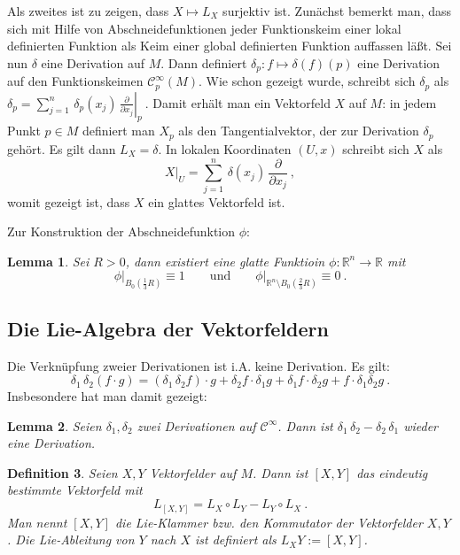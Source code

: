 \documentclass[12pt,a4paper]{article}
\def\R{\mathbb{R}}
\newtheorem{Lemma}{Lemma}[section]
\newtheorem{Definition}[Lemma]{Definition}
\def\proof{\noindent\textbf{Beweis:}\quad}
\def\qed{\quad\hfill\ensuremath{\Box}}
\begin{document}
\medskip

Als zweites ist zu zeigen, dass $X\mapsto L_X$ surjektiv ist. Zun\"achst bemerkt man, dass sich mit
Hilfe von Abschneidefunktionen jeder Funktionskeim einer lokal definierten Funktion als Keim einer
global definierten Funktion auffassen l\"a\ss t. Sei nun $\delta$ eine Derivation auf $M$. Dann
definiert $\delta_p : f\mapsto \delta(f)(p)$ eine Derivation auf den Funktionskeimen $\mathcal C^\infty_p(M)$.
Wie schon gezeigt wurde, schreibt sich $\delta_p$ als
$
\delta_p =\sum^n_{j=1} \, \delta_p(x_j)\,\left. \frac{\partial}{\partial x_j}\right|_p \ .
$
Damit erh\"alt man ein Vektorfeld $X$ auf $M$: in jedem Punkt $p\in M$ definiert man $X_p$
als den Tangentialvektor, der zur Derivation $\delta_p$ geh\"ort. Es gilt dann $L_X= \delta$.
In lokalen  Koordinaten $(U,x)$ schreibt sich $X$ als
$$
\left. X\right|_U = \sum^n_{j=1}\, \delta(x_j)\, \frac{\partial}{\partial x_j} \ ,
$$
womit gezeigt ist, dass $X$ ein glattes Vektorfeld ist.

\medskip

Zur Konstruktion der Abschneidefunktion $\phi$:


\begin{Lemma}
Sei $R>0$, dann existiert eine glatte Funktioin $\phi : \R^n\rightarrow \R$ mit
$$
\left. \phi\right|_{B_0(\frac13R)} \equiv 1
\qquad \mbox{und}  \qquad
\left. \phi\right|_{\R^n \setminus B_0(\frac23R)} \equiv 0 \ .
$$
\end{Lemma}

\subsection{Die Lie-Algebra der Vektorfeldern}



Die Verkn\"upfung zweier Derivationen ist i.A. keine Derivation. Es gilt:
$$
\delta_1 \, \delta_2 (f\cdot g) = (\delta_1 \,\delta_2 f)\cdot g  + \delta_2 f \cdot \delta_1 g
+\delta_1 f \cdot \delta_2 g + f \cdot \delta_1\delta_2 g \ .
$$
Insbesondere hat man damit gezeigt:

\begin{Lemma}
Seien $\delta_1, \delta_2$ zwei Derivationen auf $\mathcal C^\infty$. Dann ist
$\delta_1 \, \delta_2 - \delta_2 \, \delta_1$ wieder eine Derivation.
\end{Lemma}

\begin{Definition}
Seien $X,Y$ Vektorfelder auf $M$. Dann ist $[X,Y]$ das eindeutig bestimmte Vektorfeld mit
$$
L_{[X,Y]} = L_X\circ L_Y  -  L_Y\circ L_X  \ .
$$
Man nennt $[X,Y]$ die {\em Lie-Klammer} bzw. den {\em Kommutator } der Vektorfelder
$X,Y$. Die {\em Lie-Ableitung} von $Y$ nach $X$ ist definiert als $L_XY:=[X,Y]$.
\end{Definition}
\end{document}
